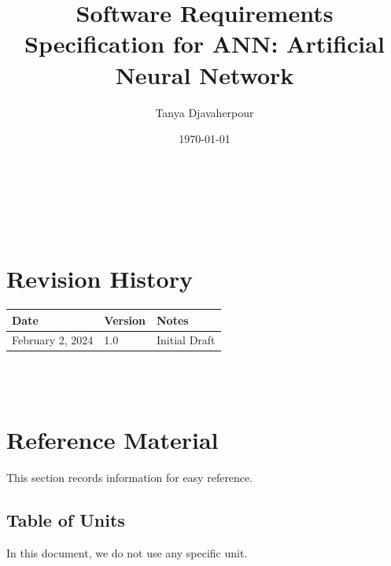 \documentclass[12pt]{article}
\begin{document}
\title{Software Requirements Specification for ANN: Artificial Neural Network} 
\author{Tanya Djavaherpour}
\date{\today}
	
\maketitle

~\newpage


\tableofcontents

~\newpage

\section*{Revision History}

\begin{tabularx}{\textwidth}{p{3cm}p{2cm}X}
\toprule {\bf Date} & {\bf Version} & {\bf Notes}\\
\midrule
February 2, 2024 & 1.0 & Initial Draft\\
\bottomrule
\end{tabularx}

~\\

~\newpage

\section{Reference Material}

This section records information for easy reference.

\subsection{Table of Units}

In this document, we do not use any specific unit.
~\newline
\end{document}
